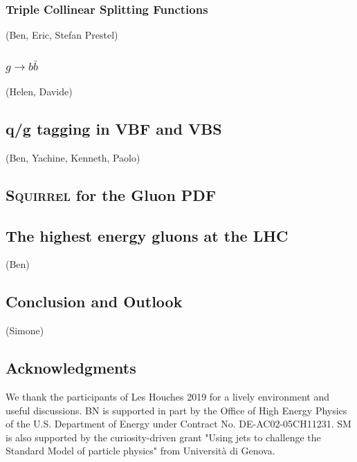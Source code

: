 \documentclass[11pt]{cernrep}
\begin{document}
\subsubsection{Triple Collinear Splitting Functions}
(Ben, Eric, Stefan Prestel)





\subsubsection{$g\to b \bar b$}
\label{sec:jets:gbb}
(Helen, Davide)

\subsection{q/g tagging in VBF and VBS}
\label{sec:jets:vbsbvf}
(Ben, Yachine, Kenneth, Paolo)



\subsection{\textsc{Squirrel} for the Gluon PDF}
\label{sec:jets:pdf}



\subsection{The highest energy gluons at the LHC}
\label{sec:jets:highest}
(Ben)

\subsection{Conclusion and Outlook}
\label{sec:jets:conclusion}
(Simone)

\subsection*{Acknowledgments}

We thank the participants of Les Houches 2019 for a lively environment and useful discussions.
BN is supported in part by the Office of High Energy Physics of the U.S. Department of Energy under Contract No. DE-AC02-05CH11231.
%
SM is also supported by the curiosity-driven grant "Using jets to challenge the Standard Model of particle physics" from Universit\`a di Genova.


\end{document}
